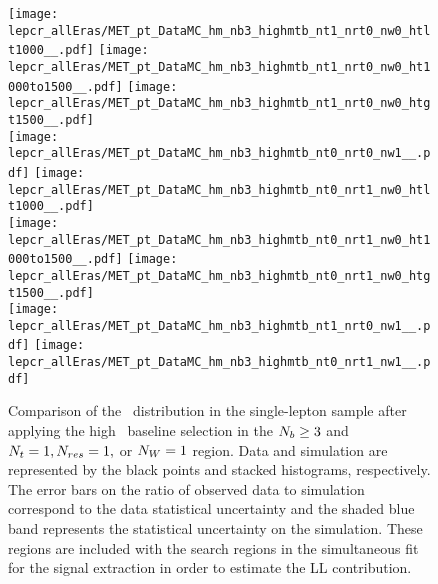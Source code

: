 \begin{figure}[!htb]
	\begin{center}
  \texttt{[image: lepcr\_allEras/MET\_pt\_DataMC\_hm\_nb3\_highmtb\_nt1\_nrt0\_nw0\_htlt1000\_\_.pdf]}
  \texttt{[image: lepcr\_allEras/MET\_pt\_DataMC\_hm\_nb3\_highmtb\_nt1\_nrt0\_nw0\_ht1000to1500\_\_.pdf]} 
  \texttt{[image: lepcr\_allEras/MET\_pt\_DataMC\_hm\_nb3\_highmtb\_nt1\_nrt0\_nw0\_htgt1500\_\_.pdf]} \\
  \texttt{[image: lepcr\_allEras/MET\_pt\_DataMC\_hm\_nb3\_highmtb\_nt0\_nrt0\_nw1\_\_.pdf]} 
  \texttt{[image: lepcr\_allEras/MET\_pt\_DataMC\_hm\_nb3\_highmtb\_nt0\_nrt1\_nw0\_htlt1000\_\_.pdf]} \\
  \texttt{[image: lepcr\_allEras/MET\_pt\_DataMC\_hm\_nb3\_highmtb\_nt0\_nrt1\_nw0\_ht1000to1500\_\_.pdf]}  
  \texttt{[image: lepcr\_allEras/MET\_pt\_DataMC\_hm\_nb3\_highmtb\_nt0\_nrt1\_nw0\_htgt1500\_\_.pdf]} \\
  \texttt{[image: lepcr\_allEras/MET\_pt\_DataMC\_hm\_nb3\_highmtb\_nt1\_nrt0\_nw1\_\_.pdf]} 
  \texttt{[image: lepcr\_allEras/MET\_pt\_DataMC\_hm\_nb3\_highmtb\_nt0\_nrt1\_nw1\_\_.pdf]} \\
	\end{center}
	\caption[Lost Lepton HM Control Region $\nb\geq3$ with 1 heavy object]{Comparison of the \met~distribution in the single-lepton sample after applying the high \dm~baseline selection in the $\nb\geq3$ and $N_{t}=1, N_{res}=1,$ or $N_{W}=1$ region. Data and simulation are represented by the black points and stacked histograms, respectively. The error bars on the ratio of observed data to simulation correspond to the data statistical uncertainty and the shaded blue band represents the statistical uncertainty on the simulation. These regions are included with the search regions in the simultaneous fit for the signal extraction in order to estimate the LL contribution.
	 }
	\label{fig:llb-1lcr-datavsmc-hm-nb3-1}
\end{figure}

